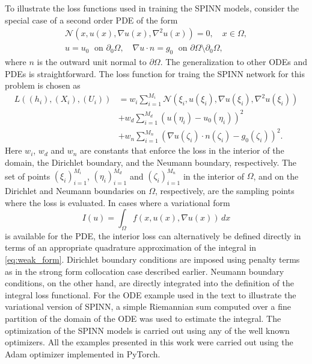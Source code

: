 \documentclass[12pt]{article}
\begin{document}
To illustrate the loss functions used in training the SPINN models, consider the special case of a second order PDE of the form
\begin{displaymath}
\begin{split}
\mathcal{N}(x, u(x), \nabla u(x), \nabla^2 u(x)) = 0, \quad x \in \Omega,\\
u = u_0 \;\text{ on }\partial_0 \Omega, \quad \nabla u \cdot n = g_0 \;\text{ on } \partial \Omega \setminus \partial_0 \Omega,
\end{split}
\end{displaymath}
where $n$ is the outward unit normal to $\partial \Omega$. The generalization to other ODEs and PDEs is straightforward. The loss function for traing the SPINN network for this problem is chosen as
\begin{equation} \label{eq:spinn_loss}
\begin{split}
L((h_i), (X_i), (U_i)) &= w_i \sum_{i=1}^{M_i} \mathcal{N}(\xi_i, u(\xi_i), \nabla u(\xi_i), \nabla^2 u(\xi_i))\\
 &+ w_d \sum_{i=1}^{M_d} (u(\eta_i) - u_0(\eta_i))^2\\
 &+ w_n \sum_{i=1}^{M_n} \left(\nabla u(\zeta_i)\cdot n(\zeta_i) - g_0(\zeta_i)\right)^2.
\end{split}
\end{equation}
Here $w_i$, $w_d$ and $w_n$ are constants that enforce the loss in the interior of the domain, the Dirichlet boundary, and the Neumann boundary, respectively. The set of points $(\xi_i)_{i=1}^{M_i}$, $(\eta_i)_{i=1}^{M_d}$ and $(\zeta_i)_{i=1}^{M_n}$ in the interior of $\Omega$, and on the Dirichlet and Neumann boundaries on $\Omega$, respectively, are the sampling points where the loss is evaluated. In cases where a variational form
\begin{equation} \label{eq:weak_form}
I(u) = \int_{\Omega} f(x, u(x), \nabla u(x))\,dx
\end{equation}
is available for the PDE, the interior loss can alternatively be defined directly in terms of an appropriate quadrature approximation of the integral in \eqref{eq:weak_form}. Dirichlet boundary conditions are imposed using penalty terms as in the strong form collocation case described earlier. Neumann boundary conditions, on the other hand, are directly integrated into the definition of the integral loss functional. For the ODE example used in the text to illustrate the variational version of SPINN, a simple Riemannian sum computed over a fine partition of the domain of the ODE was used to estimate the integral. The optimization of the SPINN models is carried out using any of the well known optimizers. All the examples presented in this work were carried out using the Adam optimizer \cite{kingma2014} implemented in PyTorch.
\end{document}
